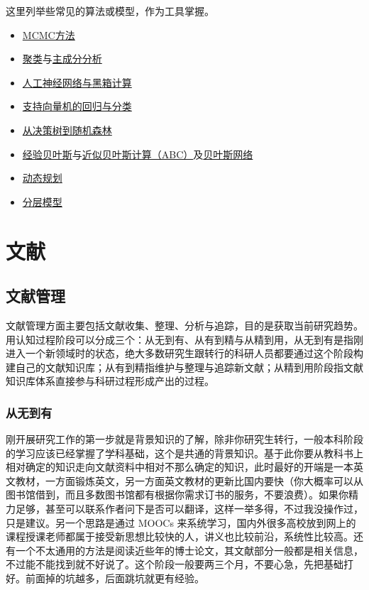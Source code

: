 \documentclass[]{tufte-book}
\providecommand{\tightlist}{%
  \setlength{\itemsep}{0pt}\setlength{\parskip}{0pt}}
\begin{document}
这里列举些常见的算法或模型，作为工具掌握。

\begin{itemize}
\tightlist
\item
  \href{https://www.nature.com/articles/nbt1004-1315}{MCMC方法}
\item
  \href{https://www.nature.com/articles/nbt0308-303}{聚类}与\href{https://www.nature.com/articles/nbt1205-1499}{主成分分析}
\item
  \href{http://www.nature.com/doifinder/10.1038/nbt1386}{人工神经网络与黑箱计算}
\item
  \href{https://www.nature.com/articles/nbt1206-1565}{支持向量机的回归与分类}
\item
  \href{http://www.nature.com/doifinder/10.1038/nbt0908-1011}{从决策树到随机森林}
\item
  \href{https://www.nature.com/articles/nbt0106-51}{经验贝叶斯}与\href{https://www.nature.com/articles/nbt0806-959}{近似贝叶斯计算（ABC）}及\href{https://www.nature.com/articles/nbt0904-1177}{贝叶斯网络}
\item
  \href{https://www.nature.com/articles/nbt0704-909}{动态规划}
\item
  \href{https://www.nature.com/articles/nbt.1619}{分层模型}
\end{itemize}

\hypertarget{lib}{%
\chapter{文献}\label{lib}}

\hypertarget{ux6587ux732eux7ba1ux7406}{%
\section{文献管理}\label{ux6587ux732eux7ba1ux7406}}

文献管理方面主要包括文献收集、整理、分析与追踪，目的是获取当前研究趋势。用认知过程阶段可以分成三个：从无到有、从有到精与从精到用，从无到有是指刚进入一个新领域时的状态，绝大多数研究生跟转行的科研人员都要通过这个阶段构建自己的文献知识库；从有到精指维护与整理与追踪新文献；从精到用阶段指文献知识库体系直接参与科研过程形成产出的过程。

\hypertarget{ux4eceux65e0ux5230ux6709}{%
\subsection{从无到有}\label{ux4eceux65e0ux5230ux6709}}

刚开展研究工作的第一步就是背景知识的了解，除非你研究生转行，一般本科阶段的学习应该已经掌握了学科基础，这个是共通的背景知识。基于此你要从教科书上相对确定的知识走向文献资料中相对不那么确定的知识，此时最好的开端是一本英文教材，一方面锻炼英文，另一方面英文教材的更新比国内要快（你大概率可以从图书馆借到，而且多数图书馆都有根据你需求订书的服务，不要浪费）。如果你精力足够，甚至可以联系作者问下是否可以翻译，这样一举多得，不过我没操作过，只是建议。另一个思路是通过 MOOCs 来系统学习，国内外很多高校放到网上的课程授课老师都属于接受新思想比较快的人，讲义也比较前沿，系统性比较高。还有一个不太通用的方法是阅读近些年的博士论文，其文献部分一般都是相关信息，不过能不能找到就不好说了。这个阶段一般要两三个月，不要心急，先把基础打好。前面掉的坑越多，后面跳坑就更有经验。
\end{document}
